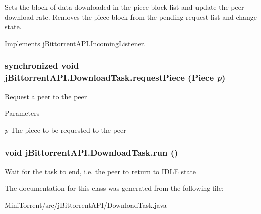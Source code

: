 Sets the block of data downloaded in the piece block list and update the peer download rate. Removes the piece block from the pending request list and change state.

Implements \hyperlink{interfacej_bittorrent_a_p_i_1_1_incoming_listener_a64813a5432e5379c8841f21f89c395a6}{jBittorrentAPI.IncomingListener}.\hypertarget{classj_bittorrent_a_p_i_1_1_download_task_abe8ce5e30e5cf362a889c239685b7885}{
\subsubsection[{requestPiece}]{\setlength{\rightskip}{0pt plus 5cm}synchronized void jBittorrentAPI.DownloadTask.requestPiece ({\bf Piece} {\em p})}}
\label{classj_bittorrent_a_p_i_1_1_download_task_abe8ce5e30e5cf362a889c239685b7885}
Request a peer to the peer 
\begin{DoxyParams}{Parameters}
\item[{\em p}]The piece to be requested to the peer \end{DoxyParams}
\hypertarget{classj_bittorrent_a_p_i_1_1_download_task_a083abaff7ffe593b7994d079e5b5cbe8}{
\subsubsection[{run}]{\setlength{\rightskip}{0pt plus 5cm}void jBittorrentAPI.DownloadTask.run ()}}
\label{classj_bittorrent_a_p_i_1_1_download_task_a083abaff7ffe593b7994d079e5b5cbe8}


Wait for the task to end, i.e. the peer to return to IDLE state

The documentation for this class was generated from the following file:\begin{DoxyCompactItemize}
\item 
MiniTorrent/src/jBittorrentAPI/DownloadTask.java\end{DoxyCompactItemize}
